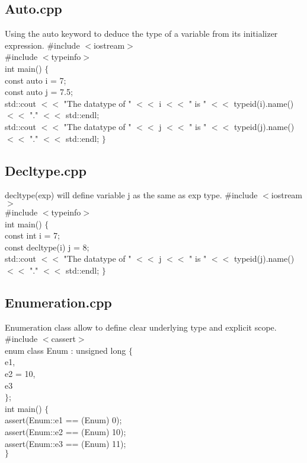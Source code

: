 \documentclass[12pt,a4paper]{report}
\begin{document}
\subsection{Auto.cpp}
\label{Auto}
{\scriptsize Using the auto keyword to deduce the type of a variable from its initializer expression.}
\newline
{\scriptsize
\#include $<$iostream$>$\\
\#include $<$typeinfo$>$\\
\newline
int main() $\lbrace$\\
  const auto i = 7;\\
  const auto j = 7.5;\\
\newline
  std::cout $<<$ "The datatype of  " $<<$ i $<<$ " is " $<<$ typeid(i).name() $<<$ "." $<<$ std::endl;\\
  std::cout $<<$ "The datatype of  " $<<$ j $<<$ " is " $<<$ typeid(j).name() $<<$ "." $<<$ std::endl;
\newline
$\rbrace$
}

\subsection{Decltype.cpp}
\label{Decltype}
{\scriptsize decltype(exp) will define variable j as the same as exp type.
\newline
\#include $<$iostream$>$\\
\#include $<$typeinfo$>$\\
\newline
int main() $\lbrace$\\
  const int i = 7;\\
  const decltype(i) j = 8;\\
\newline
  std::cout $<<$ "The datatype of  " $<<$ j $<<$ " is " $<<$ typeid(j).name() $<<$ "." $<<$ std::endl;
\newline
$\rbrace$
}
\subsection{Enumeration.cpp}
\label{Enumeration}
{\scriptsize 
Enumeration class allow to define clear underlying type and explicit scope.\\
\newline
\#include $<$cassert$>$\\
\newline
enum class Enum : unsigned long $\lbrace$\\
  e1,\\
  e2 = 10,\\
  e3\\
$\rbrace$;\\
\newline
int main() $\lbrace$\\
\newline
 assert(Enum::e1 == (Enum) 0);\\
 assert(Enum::e2 == (Enum) 10);\\
 assert(Enum::e3 == (Enum) 11);\\
$\rbrace$
}
\end{document}
